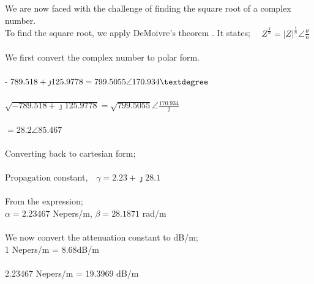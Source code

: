 \begin{exmp}
We are now faced with the challenge of finding the square root of a complex number.
\\
To find the square root, we apply DeMoivre's theorem \footnotemark[3]. It states; $ \quad Z^{\frac{1}{n}} = |Z|^{\frac{1}{n}}\angle\frac{\theta}{n} $\\\\
We first convert the complex number to polar form.\\\\
-$ 789.518 + \jmath 125.9778 = 799.5055\angle 170.934\textdegree $\\\\
$ \sqrt{-789.518 + \jmath 125.9778} = \sqrt{799.5055}\angle \frac{170.934}{2} $\\\\
$ =28.2\angle 85.467 $\\\\
Converting back to cartesian form; \\\\
Propagation constant,$\quad\gamma=2.23 +\jmath 28.1 $\\\\
From the expression; \\
$ \alpha = 2.23467 $ Nepers/m, $ \beta = 28.1871 $ rad/m\\\\
We now convert the attenuation constant to dB/m; \\
1 Nepers/m = 8.68dB/m \\\\
2.23467 Nepers/m = 19.3969 dB/m

\end{exmp} 

